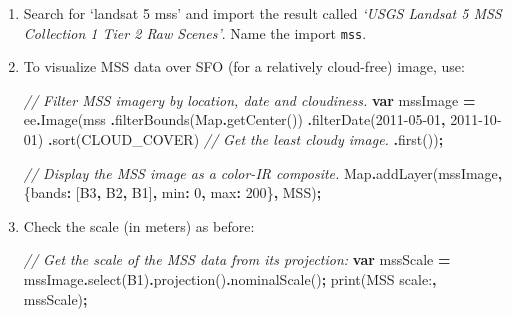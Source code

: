 \documentclass[
]{article}
\newenvironment{Shaded}{\begin{snugshade}}{\end{snugshade}}
\newcommand{\BuiltInTok}[1]{#1}
\newcommand{\CommentTok}[1]{\textcolor[rgb]{0.56,0.35,0.01}{\textit{#1}}}
\newcommand{\DataTypeTok}[1]{\textcolor[rgb]{0.13,0.29,0.53}{#1}}
\newcommand{\DecValTok}[1]{\textcolor[rgb]{0.00,0.00,0.81}{#1}}
\newcommand{\FunctionTok}[1]{\textcolor[rgb]{0.00,0.00,0.00}{#1}}
\newcommand{\KeywordTok}[1]{\textcolor[rgb]{0.13,0.29,0.53}{\textbf{#1}}}
\newcommand{\NormalTok}[1]{#1}
\newcommand{\OperatorTok}[1]{\textcolor[rgb]{0.81,0.36,0.00}{\textbf{#1}}}
\newcommand{\StringTok}[1]{\textcolor[rgb]{0.31,0.60,0.02}{#1}}
\begin{document}
\begin{enumerate}
\def\labelenumi{\arabic{enumi}.}
\item
  Search for `landsat 5 mss' and import the result called \emph{`USGS Landsat 5 MSS Collection 1 Tier 2 Raw Scenes'}. Name the import \texttt{mss}.
\item
  To visualize MSS data over SFO (for a relatively cloud-free) image, use:

\begin{Shaded}
\begin{Highlighting}[]
\CommentTok{// Filter MSS imagery by location, date and cloudiness.   }
\KeywordTok{var}\NormalTok{ mssImage }\OperatorTok{=}\NormalTok{ ee}\OperatorTok{.}\FunctionTok{Image}\NormalTok{(mss     }
                        \OperatorTok{.}\FunctionTok{filterBounds}\NormalTok{(}\BuiltInTok{Map}\OperatorTok{.}\FunctionTok{getCenter}\NormalTok{())     }
                        \OperatorTok{.}\FunctionTok{filterDate}\NormalTok{(}\StringTok{\textquotesingle{}2011{-}05{-}01\textquotesingle{}}\OperatorTok{,}  \StringTok{\textquotesingle{}2011{-}10{-}01\textquotesingle{}}\NormalTok{)     }
                        \OperatorTok{.}\FunctionTok{sort}\NormalTok{(}\StringTok{\textquotesingle{}CLOUD\_COVER\textquotesingle{}}\NormalTok{)     }
                        \CommentTok{//  Get the least cloudy image.     }
                        \OperatorTok{.}\FunctionTok{first}\NormalTok{())}\OperatorTok{;}  

\CommentTok{// Display the MSS image as a color{-}IR composite.}
\BuiltInTok{Map}\OperatorTok{.}\FunctionTok{addLayer}\NormalTok{(mssImage}\OperatorTok{,}\NormalTok{ \{}\DataTypeTok{bands}\OperatorTok{:}\NormalTok{ [}\StringTok{\textquotesingle{}B3\textquotesingle{}}\OperatorTok{,} \StringTok{\textquotesingle{}B2\textquotesingle{}}\OperatorTok{,} \StringTok{\textquotesingle{}B1\textquotesingle{}}\NormalTok{]}\OperatorTok{,} \DataTypeTok{min}\OperatorTok{:} \DecValTok{0}\OperatorTok{,} \DataTypeTok{max}\OperatorTok{:} \DecValTok{200}\NormalTok{\}}\OperatorTok{,} \StringTok{\textquotesingle{}MSS\textquotesingle{}}\NormalTok{)}\OperatorTok{;}
\end{Highlighting}
\end{Shaded}
\item
  Check the scale (in meters) as before:

\begin{Shaded}
\begin{Highlighting}[]
\CommentTok{// Get the scale of the MSS data from its projection:}
\KeywordTok{var}\NormalTok{ mssScale }\OperatorTok{=}\NormalTok{ mssImage}\OperatorTok{.}\FunctionTok{select}\NormalTok{(}\StringTok{\textquotesingle{}B1\textquotesingle{}}\NormalTok{)}\OperatorTok{.}\FunctionTok{projection}\NormalTok{()}\OperatorTok{.}\FunctionTok{nominalScale}\NormalTok{()}\OperatorTok{;}
\FunctionTok{print}\NormalTok{(}\StringTok{\textquotesingle{}MSS scale:\textquotesingle{}}\OperatorTok{,}\NormalTok{ mssScale)}\OperatorTok{;}
\end{Highlighting}
\end{Shaded}
\end{enumerate}
\end{document}
